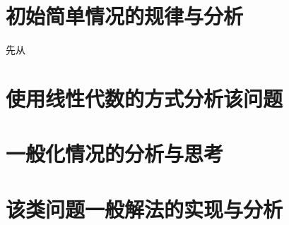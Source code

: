 \documentclass[UTF-8,a4paper]{ctexart}
\begin{document}
\part{初始简单情况的规律与分析}
\songti 先从
\part{使用线性代数的方式分析该问题}
\part{一般化情况的分析与思考}
\part{该类问题一般解法的实现与分析}
\end{document}
